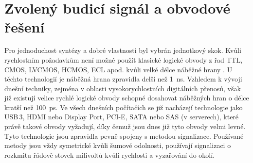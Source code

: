 \section{Zvolený budicí signál a obvodové řešení}
Pro jednoduchost syntézy a dobré vlastnosti byl vybrán jednotkový skok. Kvůli rychlostním požadavkům není možné použít klasické logické obvody z řad \acrshort{TTL}, \acrshort{CMOS}, \acrshort{LVCMOS}, \acrshort{HCMOS}, \acrshort{ECL} apod. kvůli velké délce náběžné hrany \cite{subnanosecondgeneratorcomparison}. U těchto technologií je náběžná hrana zpravidla delší než \SI{1}{\nano\second}. Vzhledem k vývoji dnešní techniky, zejména v oblasti vysokorychlostních digitálních přenosů, však již existují velice rychlé logické obvody schopné dosahovat náběžných hran o délce kratší než \SI{100}{\pico\second}. Ve všech dnešních počítačích se již nacházejí technologie jako \acrshort{USB}\,3, \acrshort{HDMI} nebo Display Port, \acrshort{PCI-E}, \acrshort{SATA} nebo \acrshort{SAS} (v serverech), které právě takové obvody vyžadují, díky čemuž jsou dnes již tyto obvody velmi levné. Tyto technologie jsou zpravidla pevně spojeny s metodou signalizace. Používané metody jsou vždy symetrické kvůli šumové odolnosti, používají signalizaci o rozkmitu řádově stovek milivoltů kvůli rychlosti a vyzařování do okolí. 

